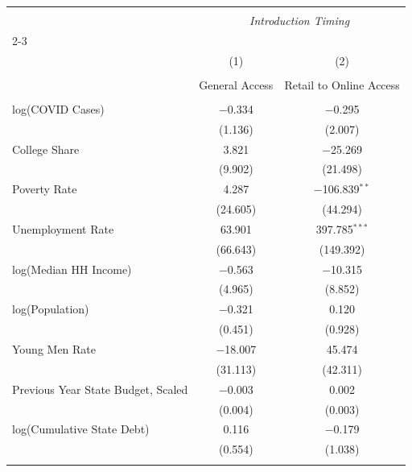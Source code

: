 \begin{tabular}{@{\extracolsep{5pt}}lcc} 
\\[-1.8ex]\hline 
\hline \\[-1.8ex] 
 & \multicolumn{2}{c}{\textit{Introduction Timing}} \\ 
\cline{2-3} 
\\[-1.8ex] & (1) & (2)\\ 
\\[-1.8ex] & General Access & Retail to Online Access \\
\hline \\[-1.8ex] 

 \enspace log(COVID Cases) & $-$0.334 & $-$0.295 \\ 
  & (1.136) & (2.007) \\ 
   \addlinespace

 \enspace College Share & 3.821 & $-$25.269 \\ 
  & (9.902) & (21.498) \\ 
   \addlinespace

 \enspace Poverty Rate & 4.287 & $-$106.839$^{**}$ \\ 
  & (24.605) & (44.294) \\ 
   \addlinespace

 \enspace Unemployment Rate & 63.901 & 397.785$^{***}$ \\ 
  & (66.643) & (149.392) \\ 
   \addlinespace

 \enspace log(Median HH Income) & $-$0.563 & $-$10.315 \\ 
  & (4.965) & (8.852) \\ 
   \addlinespace

 \enspace log(Population) & $-$0.321 & 0.120 \\ 
  & (0.451) & (0.928) \\ 
   \addlinespace

 \enspace Young Men Rate & $-$18.007 & 45.474 \\ 
  & (31.113) & (42.311) \\ 
   \addlinespace

 \enspace Previous Year State Budget, Scaled & $-$0.003 & 0.002 \\ 
  & (0.004) & (0.003) \\ 
   \addlinespace

 \enspace log(Cumulative State Debt) & 0.116 & $-$0.179 \\ 
  & (0.554) & (1.038) \\ 
   \addlinespace


\end{tabular}
